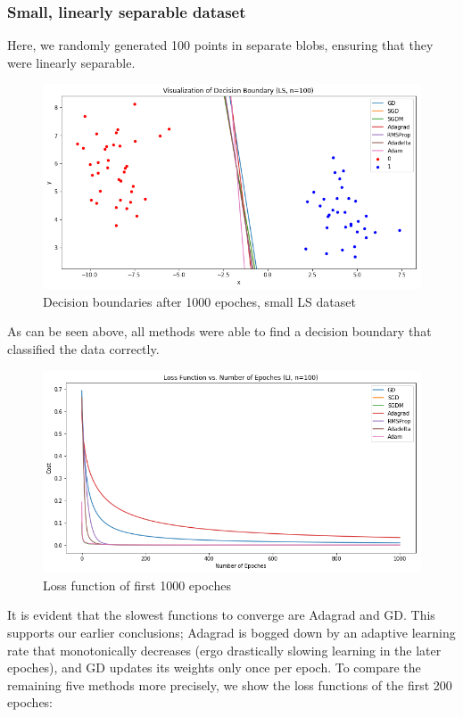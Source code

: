 \documentclass[twoside,11pt]{homework}
\begin{document}
\subsubsection{Small, linearly separable dataset}
Here, we randomly generated 100 points in separate blobs, ensuring that they were linearly separable. 
\begin{figure}[H]
		\centering
		\includegraphics[scale=.5]{q5/sep_100/lines.png}	
		\caption{Decision boundaries after 1000 epoches, small LS dataset}
	\end{figure}
	
As can be seen above, all methods were able to find a decision boundary that classified the data correctly.

	\begin{figure}[H]
		\centering
		\includegraphics[scale=.5]{q5/sep_100/loss_n1000.png}	
		\caption{Loss function of first 1000 epoches}
	\end{figure}
	
It is evident that the slowest functions to converge are Adagrad and GD. This supports our earlier conclusions; Adagrad is bogged down by an adaptive learning rate that monotonically decreases (ergo drastically slowing learning in the later epoches), and GD updates its weights only once per epoch. To compare the remaining five methods more precisely, we show the loss functions of the first 200 epoches:
\end{document}
